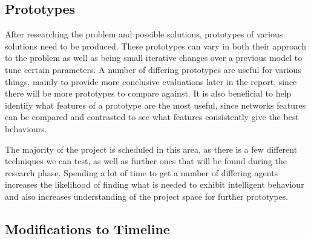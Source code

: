 \subsection{Prototypes}

After researching the problem and possible solutions, prototypes of various
solutions need to be produced. These prototypes can vary in both their approach
to the problem as well as being small iterative changes over a previous model
to tune certain parameters. A number of differing prototypes are useful for
various things, mainly to provide more conclusive evaluations later in the report,
since there will be more prototypes to compare against. It is also beneficial to
help identify what features of a prototype are the most useful, since networks
features can be compared and contrasted to see what features consistently give the
best behaviours.

The majority of the project is scheduled in this area, as there is a few
different techniques we can test, as well as further ones that will be found
during the research phase. Spending a lot of time to get a number of differing
agents increases the likelihood of finding what is needed to exhibit intelligent
behaviour and also increases understanding of the project space for further
prototypes.

\subsection{Modifications to Timeline}
